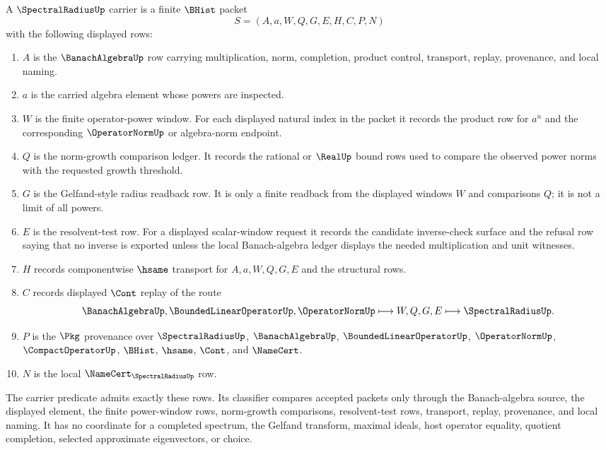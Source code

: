 \begin{definition}
\label{def:spectral-radius-carrier}
A $\SpectralRadiusUp$ carrier is a finite $\BHist$ packet
$$
S=(A,a,W,Q,G,E,H,C,P,N)
$$
with the following displayed rows:
\begin{enumerate}
\item $A$ is the $\BanachAlgebraUp$ row carrying multiplication, norm, completion, product control, transport, replay, provenance, and local naming.
\item $a$ is the carried algebra element whose powers are inspected.
\item $W$ is the finite operator-power window. For each displayed natural index in the packet it records the product row for $a^n$ and the corresponding $\OperatorNormUp$ or algebra-norm endpoint.
\item $Q$ is the norm-growth comparison ledger. It records the rational or $\RealUp$ bound rows used to compare the observed power norms with the requested growth threshold.
\item $G$ is the Gelfand-style radius readback row. It is only a finite readback from the displayed windows $W$ and comparisons $Q$; it is not a limit of all powers.
\item $E$ is the resolvent-test row. For a displayed scalar-window request it records the candidate inverse-check surface and the refusal row saying that no inverse is exported unless the local Banach-algebra ledger displays the needed multiplication and unit witnesses.
\item $H$ records componentwise $\hsame$ transport for $A,a,W,Q,G,E$ and the structural rows.
\item $C$ records displayed $\Cont$ replay of the route
$$
\BanachAlgebraUp,\BoundedLinearOperatorUp,\OperatorNormUp
\longmapsto W,Q,G,E
\longmapsto \SpectralRadiusUp .
$$
\item $P$ is the $\Pkg$ provenance over $\SpectralRadiusUp$, $\BanachAlgebraUp$, $\BoundedLinearOperatorUp$, $\OperatorNormUp$, $\CompactOperatorUp$, $\BHist$, $\hsame$, $\Cont$, and $\NameCert$.
\item $N$ is the local $\NameCert_{\SpectralRadiusUp}$ row.
\end{enumerate}
The carrier predicate admits exactly these rows. Its classifier compares accepted packets only through the Banach-algebra source, the displayed element, the finite power-window rows, norm-growth comparisons, resolvent-test rows, transport, replay, provenance, and local naming. It has no coordinate for a completed spectrum, the Gelfand transform, maximal ideals, host operator equality, quotient completion, selected approximate eigenvectors, or choice.
\end{definition}


